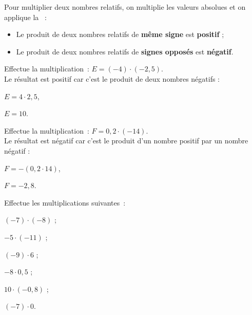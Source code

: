 

\begin{aconnaitre}
Pour multiplier deux nombres relatifs, on multiplie les valeurs absolues et on applique la  :
\begin{itemize}
 \item Le produit de deux nombres relatifs de \textbf{même signe} est \textbf{positif} ;
 \item Le produit de deux nombres relatifs de \textbf{signes opposés} est \textbf{négatif}.
 \end{itemize}
\end{aconnaitre}

\begin{methode*1}

 \begin{exemple*1}
Effectue la multiplication : $E = (-4) \cdot (-2,5)$. \\[0.5em]
Le résultat est positif car c'est le produit de deux nombres négatifs :

$E = 4 \cdot 2,5$,

$E = 10$.
 \end{exemple*1}

 \begin{exemple*1}
Effectue la multiplication : $F = 0,2 \cdot (-14)$. \\[0.5em]
Le résultat est négatif car c'est le produit d'un nombre positif par un nombre négatif :

$F = -(0,2 \cdot 14)$,

$F = -2,8$.
 \end{exemple*1}

 \exercice  
Effectue les multiplications suivantes :
\begin{colenumerate}{3}
 \item $(-7) \cdot (-8)$ ;
 \item $-5 \cdot (-11)$ ;
 \item $(-9) \cdot 6$ ;
 \item $-8 \cdot 0,5$ ;
 \item $10 \cdot (-0,8)$ ;
 \item $(-7) \cdot 0$.
 \end{colenumerate}

 \end{methode*1}
 
